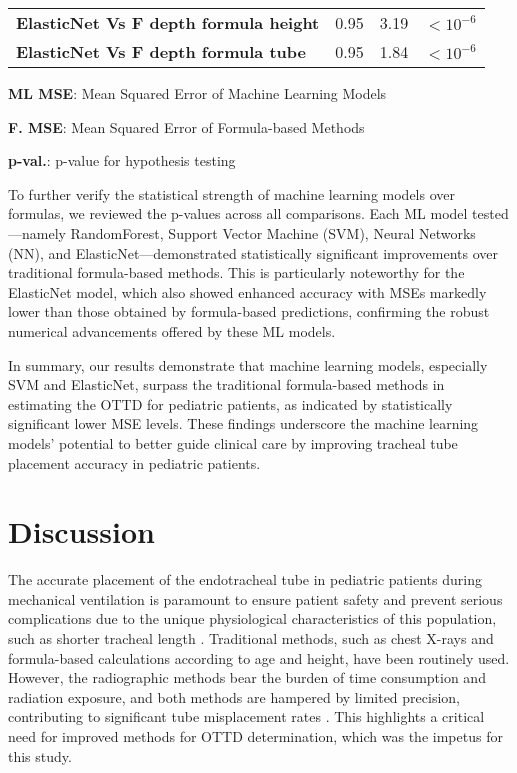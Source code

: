 \documentclass[11pt]{article}
\begin{document}
\begin{table}[h]
\begin{threeparttable}
{\begin{tabular}{lrrl}
\textbf{ElasticNet Vs F depth formula height} & \raisebox{2ex}{\hypertarget{B10a}{}}0.95 & \raisebox{2ex}{\hypertarget{B10b}{}}3.19 & $<$\raisebox{2ex}{\hypertarget{B10c}{}}$10^{-6}$ \\
\textbf{ElasticNet Vs F depth formula tube} & \raisebox{2ex}{\hypertarget{B11a}{}}0.95 & \raisebox{2ex}{\hypertarget{B11b}{}}1.84 & $<$\raisebox{2ex}{\hypertarget{B11c}{}}$10^{-6}$ \\
\bottomrule
\end{tabular}}
\begin{tablenotes}
\footnotesize
\item \textbf{ML MSE}: Mean Squared Error of Machine Learning Models
\item \textbf{F. MSE}: Mean Squared Error of Formula-based Methods
\item \textbf{p-val.}: p-value for hypothesis testing
\end{tablenotes}
\end{threeparttable}
\end{table}

To further verify the statistical strength of machine learning models over formulas, we reviewed the p-values across all comparisons. Each ML model tested—namely RandomForest, Support Vector Machine (SVM), Neural Networks (NN), and ElasticNet—demonstrated statistically significant improvements over traditional formula-based methods. This is particularly noteworthy for the ElasticNet model, which also showed enhanced accuracy with MSEs markedly lower than those obtained by formula-based predictions, confirming the robust numerical advancements offered by these ML models.

In summary, our results demonstrate that machine learning models, especially SVM and ElasticNet, surpass the traditional formula-based methods in estimating the OTTD for pediatric patients, as indicated by statistically significant lower MSE levels. These findings underscore the machine learning models' potential to better guide clinical care by improving tracheal tube placement accuracy in pediatric patients.

\section*{Discussion}

The accurate placement of the endotracheal tube in pediatric patients during mechanical ventilation is paramount to ensure patient safety and prevent serious complications due to the unique physiological characteristics of this population, such as shorter tracheal length \cite{Kollef1994EndotrachealTM}. Traditional methods, such as chest X-rays and formula-based calculations according to age and height, have been routinely used. However, the radiographic methods bear the burden of time consumption and radiation exposure, and both methods are hampered by limited precision, contributing to significant tube misplacement rates \cite{Cook2005ThePL, Kerrey2009APC}. This highlights a critical need for improved methods for OTTD determination, which was the impetus for this study.
\end{document}
